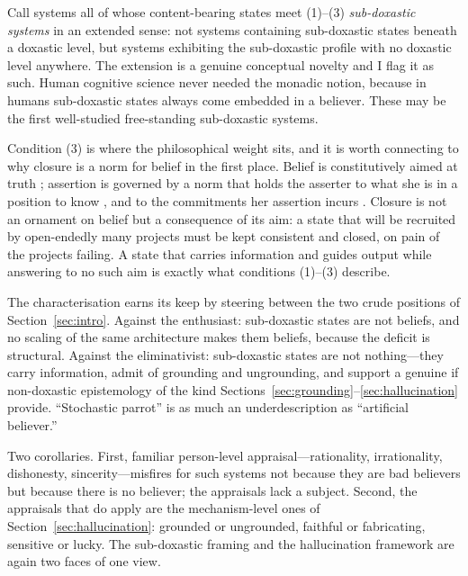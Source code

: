 Call systems all of whose content-bearing states meet (1)--(3) \emph{sub-doxastic
systems} in an extended sense: not systems containing sub-doxastic states beneath
a doxastic level, but systems exhibiting the sub-doxastic profile with no doxastic
level anywhere. The extension is a genuine conceptual novelty and I flag it as
such. Human cognitive science never needed the monadic notion, because in humans
sub-doxastic states always come embedded in a believer. These may be the first
well-studied free-standing sub-doxastic systems.

Condition (3) is where the philosophical weight sits, and it is worth connecting
to why closure is a norm for belief in the first place. Belief is constitutively
aimed at truth \citep{shah2005,wedgwood2002}; assertion is governed by a norm
that holds the asserter to what she is in a position to know
\citep{williamson2000}, and to the commitments her assertion incurs
\citep{brandom1994}. Closure is not an ornament on belief but a consequence of
its aim: a state that will be recruited by open-endedly many projects must be
kept consistent and closed, on pain of the projects failing. A state that carries
information and guides output while answering to no such aim is exactly what
conditions (1)--(3) describe.

The characterisation earns its keep by steering between the two crude positions
of Section~\ref{sec:intro}. Against the enthusiast: sub-doxastic states are not
beliefs, and no scaling of the same architecture makes them beliefs, because the
deficit is structural. Against the eliminativist: sub-doxastic states are not
nothing---they carry information, admit of grounding and ungrounding, and support
a genuine if non-doxastic epistemology of the kind
Sections~\ref{sec:grounding}--\ref{sec:hallucination} provide. ``Stochastic
parrot'' is as much an underdescription as ``artificial believer.''

Two corollaries. First, familiar person-level appraisal---rationality,
irrationality, dishonesty, sincerity---misfires for such systems not because they
are bad believers but because there is no believer; the appraisals lack a
subject. Second, the appraisals that do apply are the mechanism-level ones of
Section~\ref{sec:hallucination}: grounded or ungrounded, faithful or fabricating,
sensitive or lucky. The sub-doxastic framing and the hallucination framework are
again two faces of one view.
